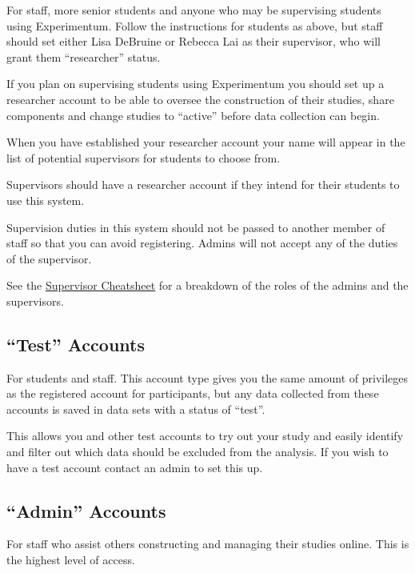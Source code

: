 \documentclass[]{book}
\begin{document}
For staff, more senior students and anyone who may be supervising students using Experimentum. Follow the instructions for students as above, but staff should set either Lisa DeBruine or Rebecca Lai as their supervisor, who will grant them ``researcher'' status.

If you plan on supervising students using Experimentum you should set up a researcher account to be able to oversee the construction of their studies, share components and change studies to ``active'' before data collection can begin.

When you have established your researcher account your name will appear in the list of potential supervisors for students to choose from.

\begin{warning}
Supervisors should have a researcher account if they intend for their
students to use this system.

Supervision duties in this system should not be passed to another member
of staff so that you can avoid registering. Admins will not accept any
of the duties of the supervisor.

See the \protect\hyperlink{roles}{Supervisor Cheatsheet} for a breakdown
of the roles of the admins and the supervisors.
\end{warning}

\hypertarget{test-accounts}{%
\subsection{``Test'' Accounts}\label{test-accounts}}

For students and staff. This account type gives you the same amount of privileges as the registered account for participants, but any data collected from these accounts is saved in data sets with a status of ``test''.

This allows you and other test accounts to try out your study and easily identify and filter out which data should be excluded from the analysis. If you wish to have a test account contact an admin to set this up.

\hypertarget{admin-accounts}{%
\subsection{``Admin'' Accounts}\label{admin-accounts}}

For staff who assist others constructing and managing their studies online. This is the highest level of access.
\end{document}
